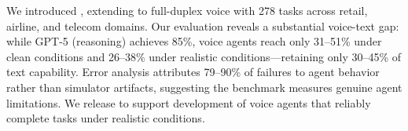 We introduced \textbf{\tauvoice{}}, extending \tautwobench{} to full-duplex voice with 278 tasks across retail, airline, and telecom domains. Our evaluation reveals a substantial voice-text gap: while GPT-5 (reasoning) achieves 85\%, voice agents reach only 31--51\% under clean conditions and 26--38\% under realistic conditions---retaining only 30--45\% of text capability. Error analysis attributes 79--90\% of failures to agent behavior rather than simulator artifacts, suggesting the benchmark measures genuine agent limitations. We release \tauvoice{} to support development of voice agents that reliably complete tasks under realistic conditions.
